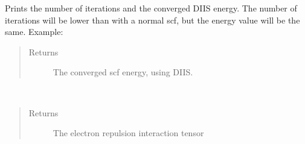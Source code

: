 \documentclass[letterpaper,10pt,english]{sphinxmanual}
\begin{document}
\begin{fulllineitems}
\begin{fulllineitems}
\label{\detokenize{RHF:ghf.RHF.RHF.get_scf_solution_diis}}
Prints the number of iterations and the converged DIIS energy. The number of iterations will be lower than with
a normal scf, but the energy value will be the same. Example:

\begin{sphinxVerbatim}[commandchars=\\\{\}]
       
   
\end{sphinxVerbatim}
\begin{quote}\begin{description}
\item[{Returns}] \leavevmode
The converged scf energy, using DIIS.

\end{description}\end{quote}

\end{fulllineitems}


\begin{fulllineitems}
\label{\detokenize{RHF:ghf.RHF.RHF.get_two_e}}~\begin{quote}\begin{description}
\item[{Returns}] \leavevmode
The electron repulsion interaction tensor

\end{description}\end{quote}

\end{fulllineitems}


\end{fulllineitems}
\end{document}
